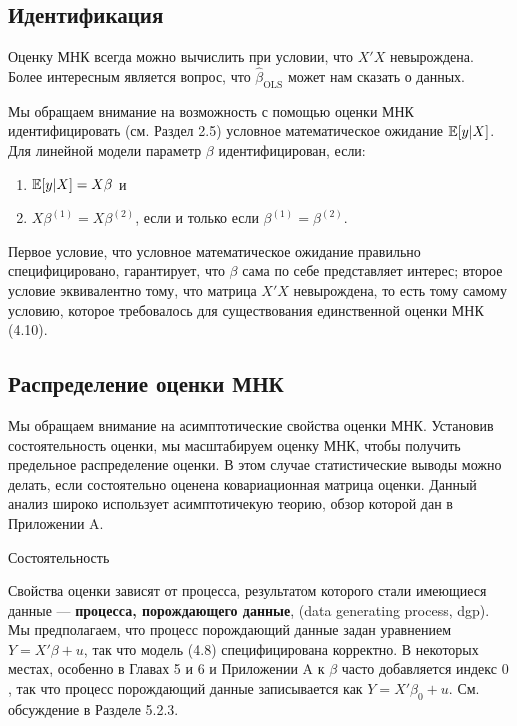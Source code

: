 \subsection{Идентификация}

Оценку МНК всегда можно вычислить при условии, что $X'X$ невырождена. Более интересным является вопрос, что $\hat{\beta}_{\text{OLS}}$ может нам сказать о данных.

Мы обращаем внимание на возможность с помощью оценки МНК идентифицировать (см. Раздел 2.5) условное математическое ожидание $\mathbb{E}[y|X]$. Для линейной модели параметр $\beta$ идентифицирован, если:
\begin{enumerate}
\item $\mathbb{E}{[y|X]}=X\beta$ и
\item $X\beta^{(1)}=X\beta^{(2)}$, если и только если $\beta^{(1)}=\beta^{(2)}$.
\end{enumerate}
Первое условие, что условное математическое ожидание правильно специфицировано, гарантирует, что $\beta$ сама по себе представляет интерес; второе условие эквивалентно тому, что матрица $X'X$ невырождена, то есть тому самому условию, которое требовалось для существования единственной оценки МНК (4.10).

\subsection{Распределение оценки МНК}
Мы обращаем внимание на асимптотические свойства оценки МНК. Установив состоятельность оценки, мы масштабируем оценку МНК, чтобы получить предельное распределение оценки. В этом случае статистические выводы можно делать, если состоятельно оценена ковариационная матрица оценки. Данный анализ широко использует асимптотичекую теорию, обзор которой дан в Приложении A.

\begin{center}
Состоятельность
\end{center}

Свойства оценки зависят от процесса, результатом которого стали имеющиеся данные --- \textbf{процесса, порождающего данные}, (data generating process, dgp). Мы предполагаем, что процесс порождающий данные задан уравнением  $Y = X'\beta + u$, так что модель (4.8) специфицирована корректно. В некоторых местах, особенно в Главах 5 и 6 и Приложении A к $\beta$ часто добавляется индекс $0$, так что процесс порождающий данные записывается как  $Y = X'\beta_0 + u$. См. обсуждение в Разделе 5.2.3.

